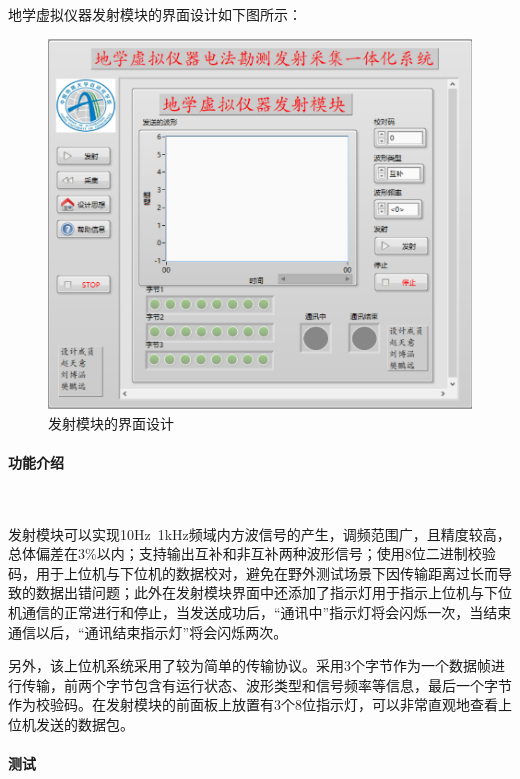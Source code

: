 \documentclass[UTF8]{article}
\begin{document}
地学虚拟仪器发射模块的界面设计如下图所示：
\begin{figure}[H]
    \centering %
    \includegraphics[width=.6\textwidth]{figure/发射界面.png} 
    \caption{发射模块的界面设计} %
\end{figure}

\paragraph{功能介绍}~{}

发射模块可以实现10Hz~1kHz频域内方波信号的产生，调频范围广，且精度较高，总体偏差在3\%以内；支持输出互补和非互补两种波形信号；使用8位二进制校验码，用于上位机与下位机的数据校对，避免在野外测试场景下因传输距离过长而导致的数据出错问题；此外在发射模块界面中还添加了指示灯用于指示上位机与下位机通信的正常进行和停止，当发送成功后，“通讯中”指示灯将会闪烁一次，当结束通信以后，“通讯结束指示灯”将会闪烁两次。

另外，该上位机系统采用了较为简单的传输协议。采用3个字节作为一个数据帧进行传输，前两个字节包含有运行状态、波形类型和信号频率等信息，最后一个字节作为校验码。在发射模块的前面板上放置有3个8位指示灯，可以非常直观地查看上位机发送的数据包。

\paragraph{测试}~{}
\end{document}
